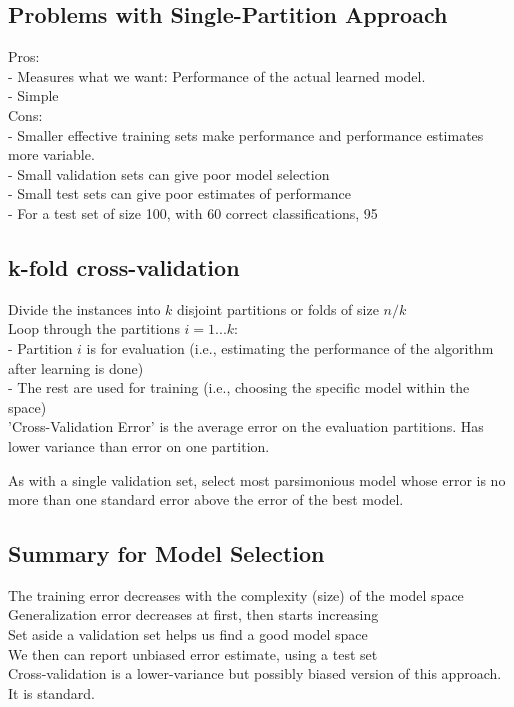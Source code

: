 \documentclass[10pt,landscape,a4paper]{cheatsheet}
\begin{document}
  \subsection{Problems with Single-Partition Approach}
  Pros:\\
    -  Measures what we want: Performance of the actual learned model.\\
    -  Simple\\
  Cons:\\
    -  Smaller effective training sets make performance and performance estimates more variable.\\
    -  Small validation sets can give poor model selection\\
    -  Small test sets can give poor estimates of performance\\
    -  For a test set of size 100, with 60 correct classifications,
        95%

  \subsection{k-fold cross-validation}
  Divide the instances into $k$ disjoint partitions or folds of size $n/k$\\
  Loop through the partitions $i = 1 ... k$:\\
    -  Partition $i$ is for evaluation (i.e., estimating the performance of the algorithm after learning is done)\\
    -  The rest are used for training (i.e., choosing the specific model within the space)\\
  'Cross-Validation Error' is the average error on the evaluation partitions. Has lower variance than error on one partition.\newline 

  As with a single validation set, select most parsimonious model whose error is no more than one standard error above the error of the best model.

  \subsection{Summary for Model Selection}
   The training error decreases with the complexity (size) of the model space\\
   Generalization error decreases at first, then starts increasing\\
   Set aside a validation set helps us find a good model space\\
   We then can report unbiased error estimate, using a test set\\
   Cross-validation is a lower-variance but possibly biased version of this approach. It is standard.\\
\end{document}
